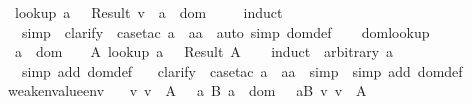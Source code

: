\begin{isabellebody}
\ \ {\isachardoublequoteopen}lookup\ a\ {\isasymSigma}\ {\isacharequal}\ Result\ v\ {\isasymLongrightarrow}\ a\ {\isasymin}\ dom\ {\isasymSigma}{\isachardoublequoteclose}\isanewline
\isadelimproof
\ \ \endisadelimproof
\isatagproof
{}\isamarkupfalse \ {\isacharparenleft}induct\ {\isasymSigma}{\isacharparenright}\isanewline
\ \ \isamarkupfalse \ simp\ \isamarkupfalse \ clarify\ \isamarkupfalse \ {\isacharparenleft}case{\isacharunderscore}tac\ {\isachardoublequoteopen}a\ {\isacharequal}\ aa{\isachardoublequoteclose}{\isacharparenright}\ \isamarkupfalse \ {\isacharparenleft}auto\ simp{\isacharcolon}\ dom{\isacharunderscore}def{\isacharparenright}\isanewline
\ \ \isamarkupfalse \endisatagproof
{\isafoldproof}\isadelimproof
\isanewline
\endisadelimproof
\isanewline
{}\isamarkupfalse \ dom{\isacharunderscore}lookup{\isacharcolon}\isanewline
\ \ {\isachardoublequoteopen}a\ {\isasymin}\ dom\ {\isasymSigma}\ {\isasymLongrightarrow}\ {\isacharparenleft}{\isasymexists}\ A{\isachardot}\ lookup\ a\ {\isasymSigma}\ {\isacharequal}\ Result\ A{\isacharparenright}{\isachardoublequoteclose}\isanewline
\isadelimproof
\ \ \endisadelimproof
\isatagproof
{}\isamarkupfalse \ {\isacharparenleft}induct\ {\isasymSigma}\ arbitrary{\isacharcolon}\ a{\isacharparenright}\isanewline
\ \ \isamarkupfalse \ {\isacharparenleft}simp\ add{\isacharcolon}\ dom{\isacharunderscore}def{\isacharparenright}\isanewline
\ \ \isamarkupfalse \ clarify\ \isamarkupfalse \ {\isacharparenleft}case{\isacharunderscore}tac\ {\isachardoublequoteopen}a\ {\isacharequal}\ aa{\isachardoublequoteclose}{\isacharparenright}\ \isamarkupfalse \ simp\ \isamarkupfalse \ {\isacharparenleft}simp\ add{\isacharcolon}\ dom{\isacharunderscore}def{\isacharparenright}\isanewline
\ \ \isamarkupfalse \endisatagproof
{\isafoldproof}\isadelimproof
\isanewline
\endisadelimproof
\isanewline
{}\isamarkupfalse \ weaken{\isacharunderscore}value{\isacharunderscore}env{\isacharcolon}\isanewline
\ \ {\isachardoublequoteopen}{\isacharparenleft}{\isasymSigma}\ {\isasymturnstile}v\ v\ {\isacharcolon}\ A\ {\isasymlongrightarrow}\ {\isacharparenleft}{\isasymforall}\ a\ B{\isachardot}\ a\ {\isasymnotin}\ dom\ {\isasymSigma}\ {\isasymlongrightarrow}\ {\isacharparenleft}a{\isacharcomma}B{\isacharparenright}{\isacharhash}{\isasymSigma}\ {\isasymturnstile}v\ v\ {\isacharcolon}\ A{\isacharparenright}{\isacharparenright}\isanewline

\end{isabellebody}
